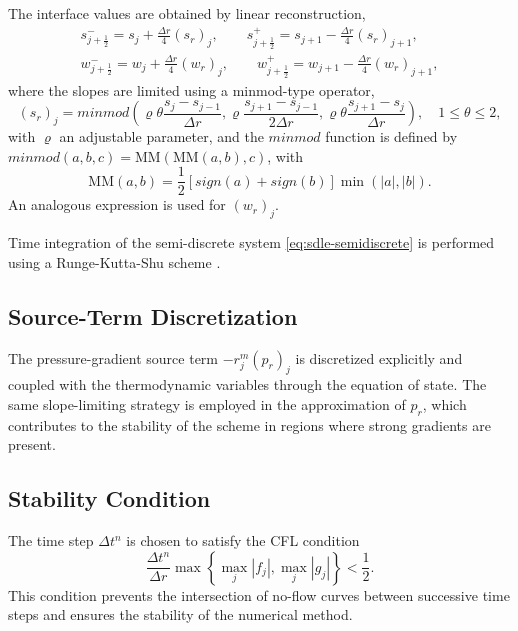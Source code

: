 \documentclass[11pt]{article}
\begin{document}
The interface values are obtained by linear reconstruction,
\begin{align*}
s^{-}_{j+\frac12} = s_j + \frac{\Delta r}{4}(s_r)_j,
\qquad
s^{+}_{j+\frac12} = s_{j+1} - \frac{\Delta r}{4}(s_r)_{j+1},\\
w^{-}_{j+\frac12} = w_j + \frac{\Delta r}{4}(w_r)_j,
\qquad
w^{+}_{j+\frac12} = w_{j+1} - \frac{\Delta r}{4}(w_r)_{j+1},
\end{align*}
where the slopes are limited using a minmod-type operator,
\begin{equation}
    (s_{r})_{j} = minmod \left(\varrho\theta\dfrac{s_{j}-s_{j-1}}{\Delta r}, \varrho\dfrac{s_{j+1}-s_{j-1}}{2\Delta r}, \varrho\theta\dfrac{s_{j+1}-s_{j}}{\Delta r} \right), \quad 1 \leqslant \theta \leqslant 2,
    \label{midmod}
\end{equation}
with $\varrho$ an adjustable parameter, and the $minmod$ function is defined by $minmod(a,b,c) = \mbox{MM}(\mbox{MM}(a,b),c)$,
with
\begin{equation*}
    \mbox{MM}(a,b) = \frac{1}{2}\left[sign(a)+sign(b)\right]\min(\vert a \vert,\vert b \vert).
    \label{MM_mod}
\end{equation*}
An analogous expression is used for $(w_r)_j$.

Time integration of the semi-discrete system \eqref{eq:sdle-semidiscrete} is performed using a Runge-Kutta-Shu scheme \cite{shu1988,shu1989}.

\subsection*{Source-Term Discretization}

The pressure-gradient source term $-r_j^{m}(p_r)_j$ is discretized explicitly and coupled with the thermodynamic variables through the equation of state. The same slope-limiting strategy is employed in the approximation of $p_r$, which contributes to the stability of the scheme in regions where strong gradients are present.

\subsection*{Stability Condition}

The time step $\Delta t^n$ is chosen to satisfy the CFL condition
\[
\frac{\Delta t^n}{\Delta r}
\max\!\left\{\max_j |f_j|,\max_j |g_j|\right\}
< \frac{1}{2}.
\]
This condition prevents the intersection of no-flow curves between successive time steps and ensures the stability of the numerical method.
\end{document}
